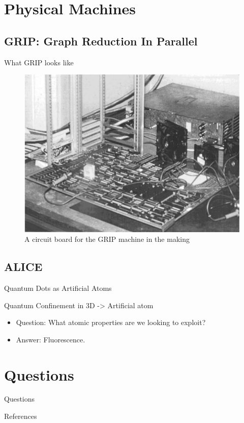 \documentclass{beamer}
\begin{document}
\section{Physical Machines}

\subsection[GRIP]{GRIP: Graph Reduction In Parallel}
\begin{frame}[fragile]{What GRIP looks like}{}

\begin{figure}[h]
 \centering
 \includegraphics[scale=.4]{figures/GRIP.png}
 \caption{A circuit board for the GRIP machine in the making \citep{PFPAnIntro}}
\end{figure}
\end{frame}

\subsection[ALICE]{ALICE}

\begin{frame}{Quantum Dots as Artificial Atoms}{}

  Quantum Confinement in 3D -> Artificial atom
  \begin{itemize}
  \item
   Question: What atomic properties are we looking to exploit?
   \pause
  \item
    Answer: Fluorescence.
  \end{itemize}
\end{frame}


\section*{Questions}

\begin{frame}
\centering
Questions
\end{frame}
\begin{frame}[allowframebreaks]{References}  %

    \def\bibfont{\scriptsize}
    

\end{frame} 
\end{document}
